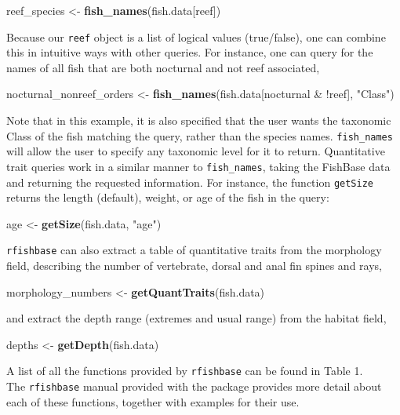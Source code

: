 \documentclass[author-year]{elsarticle} %
\newenvironment{Shaded}{}{}
\newcommand{\KeywordTok}[1]{\textcolor[rgb]{0.00,0.44,0.13}{\textbf{{#1}}}}
\newcommand{\StringTok}[1]{\textcolor[rgb]{0.25,0.44,0.63}{{#1}}}
\newcommand{\NormalTok}[1]{{#1}}
\begin{document}
\begin{Shaded}
\begin{Highlighting}[]
\NormalTok{reef_species <- }\KeywordTok{fish_names}\NormalTok{(fish.data[reef])}
\end{Highlighting}
\end{Shaded}
Because our \texttt{reef} object is a list of logical values
(true/false), one can combine this in intuitive ways with other queries.
For instance, one can query for the names of all fish that are both
nocturnal and not reef associated,

\begin{Shaded}
\begin{Highlighting}[]
\NormalTok{nocturnal_nonreef_orders <- }\KeywordTok{fish_names}\NormalTok{(fish.data[nocturnal & !reef], }\StringTok{"Class"}\NormalTok{)}
\end{Highlighting}
\end{Shaded}
Note that in this example, it is also specified that the user wants the
taxonomic Class of the fish matching the query, rather than the species
names. \texttt{fish\_names} will allow the user to specify any taxonomic
level for it to return. Quantitative trait queries work in a similar
manner to \texttt{fish\_names}, taking the FishBase data and returning
the requested information. For instance, the function \texttt{getSize}
returns the length (default), weight, or age of the fish in the query:

\begin{Shaded}
\begin{Highlighting}[]
\NormalTok{age <- }\KeywordTok{getSize}\NormalTok{(fish.data, }\StringTok{"age"}\NormalTok{)}
\end{Highlighting}
\end{Shaded}
\texttt{rfishbase} can also extract a table of quantitative traits from
the morphology field, describing the number of vertebrate, dorsal and
anal fin spines and rays,

\begin{Shaded}
\begin{Highlighting}[]
\NormalTok{morphology_numbers <- }\KeywordTok{getQuantTraits}\NormalTok{(fish.data)}
\end{Highlighting}
\end{Shaded}
and extract the depth range (extremes and usual range) from the habitat
field,

\begin{Shaded}
\begin{Highlighting}[]
\NormalTok{depths <- }\KeywordTok{getDepth}\NormalTok{(fish.data)}
\end{Highlighting}
\end{Shaded}
A list of all the functions provided by \texttt{rfishbase} can be found
in Table 1.\\The \texttt{rfishbase} manual provided with the package
provides more detail about each of these functions, together with
examples for their use.
\end{document}
